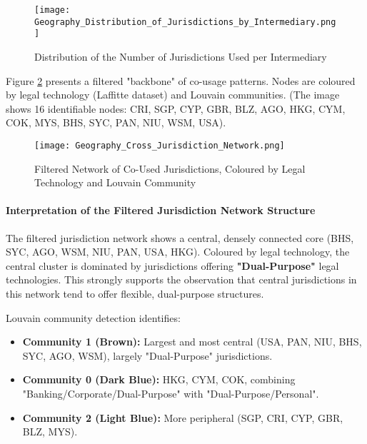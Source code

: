 \begin{figure}[htbp]
    \centering
    \texttt{[image: Geography\_Distribution\_of\_Jurisdictions\_by\_Intermediary.png]}
    \caption{Distribution of the Number of Jurisdictions Used per Intermediary}
    \label{fig:geography_distribution_jurisdictions_by_intermediary}
\end{figure}

Figure \ref{fig:geography_cross_jurisdiction_network} presents a filtered "backbone" of co-usage patterns. Nodes are coloured by legal technology (Laffitte dataset) and Louvain communities. (The image shows 16 identifiable nodes: CRI, SGP, CYP, GBR, BLZ, AGO, HKG, CYM, COK, MYS, BHS, SYC, PAN, NIU, WSM, USA).

\begin{figure}[htbp]
    \centering
    \texttt{[image: Geography\_Cross\_Jurisdiction\_Network.png]}
    \caption{Filtered Network of Co-Used Jurisdictions, Coloured by Legal Technology and Louvain Community}
    \label{fig:geography_cross_jurisdiction_network}
\end{figure}

\paragraph{Interpretation of the Filtered Jurisdiction Network Structure}
The filtered jurisdiction network shows a central, densely connected core (BHS, SYC, AGO, WSM, NIU, PAN, USA, HKG).
Coloured by legal technology, the central cluster is dominated by jurisdictions offering \textbf{"Dual-Purpose"} legal technologies. This strongly supports the observation that central jurisdictions in this network tend to offer flexible, dual-purpose structures.

Louvain community detection identifies:
\begin{itemize}
    \item \textbf{Community 1 (Brown):} Largest and most central (USA, PAN, NIU, BHS, SYC, AGO, WSM), largely "Dual-Purpose" jurisdictions.
    \item \textbf{Community 0 (Dark Blue):} HKG, CYM, COK, combining "Banking/Corporate/Dual-Purpose" with "Dual-Purpose/Personal".
    \item \textbf{Community 2 (Light Blue):} More peripheral (SGP, CRI, CYP, GBR, BLZ, MYS).
\end{itemize}


